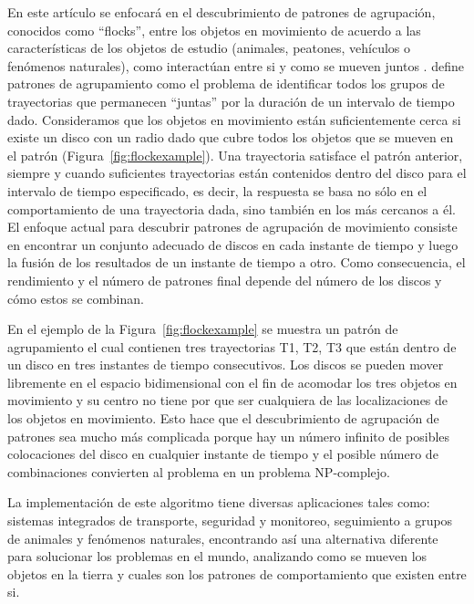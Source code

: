 En este artículo se enfocará en el descubrimiento de patrones de agrupación, conocidos como ``flocks'', entre los objetos 
en movimiento de acuerdo
a las características de los objetos de estudio (animales, peatones, vehículos o fenómenos naturales), como 
interactúan entre si y como se mueven juntos \cite{laube2005finding} \cite{uno2005lcm}.  \cite{vieira2009line} 
define patrones de agrupamiento como el problema de identificar todos los grupos de trayectorias que permanecen
``juntas'' por la duración de un intervalo de tiempo dado. Consideramos que los objetos en movimiento están suficientemente
cerca si existe un disco con un
radio dado que cubre todos los objetos que se mueven en el patrón (Figura~\ref{fig:flockexample}). Una trayectoria satisface el 
patrón anterior, siempre y cuando suficientes trayectorias están contenidos dentro del disco para el intervalo de
tiempo especificado, es decir, la respuesta se basa no sólo en el comportamiento de una trayectoria dada, sino
también en los más cercanos a él. El enfoque actual para descubrir patrones de agrupación de movimiento consiste
en encontrar un conjunto adecuado de discos en cada instante de tiempo y luego la fusión de los resultados de un 
instante de tiempo a otro. Como consecuencia, el rendimiento y el número de patrones final depende del número
de los discos y cómo estos se combinan.

En el ejemplo de la Figura~\ref{fig:flockexample} se muestra un patrón de agrupamiento el cual contienen tres 
trayectorias {T1, T2, T3}
que están dentro de un disco en tres instantes de tiempo consecutivos. Los discos se pueden
mover libremente en el espacio bidimensional con el fin de acomodar los tres objetos en movimiento  y su centro no
tiene por que ser cualquiera de las localizaciones  de los objetos en movimiento. Esto hace que el
descubrimiento de agrupación de patrones sea mucho más complicada  porque hay un número infinito de posibles
colocaciones del disco en cualquier instante de tiempo y el posible número de combinaciones convierten
al problema en un problema NP-complejo.

La implementación de este algoritmo tiene diversas aplicaciones tales como: sistemas  integrados  de  transporte,
seguridad  y  monitoreo, seguimiento  a  grupos  de  animales  y  fenómenos  naturales,  encontrando  así  una
alternativa  diferente  para  solucionar  los  problemas  en  el  mundo,  analizando  como  se mueven  los  objetos
en  la  tierra  y  cuales  son  los  patrones  de  comportamiento  que existen entre si. 

